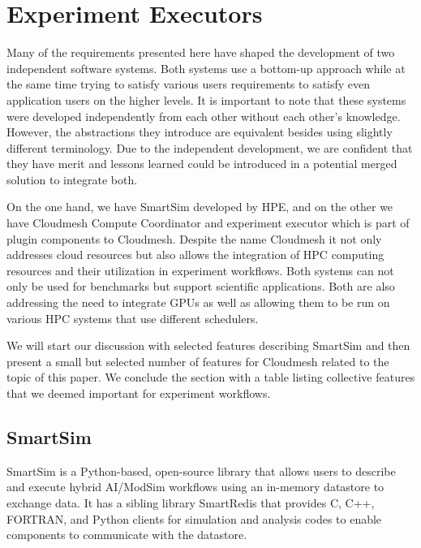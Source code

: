 \documentclass[utf8]{FrontiersinVancouver} %
\begin{document}
\section{Experiment Executors}
\label{sec:executors}

Many of the requirements presented here have shaped the development of two independent software systems. Both systems use a bottom-up approach while at the same time trying to satisfy various users requirements to satisfy even application users on the higher levels. 
It is important to note that these systems were developed independently from each other without each other's knowledge. However, the abstractions they introduce are equivalent besides using slightly different terminology. Due to the independent development, we are confident that they have merit and lessons learned could be introduced in a potential merged solution to integrate both.

On the one hand, we have SmartSim developed by HPE, and on the other we have Cloudmesh Compute Coordinator and experiment executor which is part of plugin components to Cloudmesh. Despite the name Cloudmesh it not only addresses cloud resources but also allows the integration of HPC computing resources and their utilization in experiment workflows. Both systems can not only be used for benchmarks but support scientific applications. Both are also addressing the need to integrate GPUs as well as allowing them to be run on various HPC systems that use different schedulers. 

We will start our discussion with selected features describing SmartSim and then present a small but selected number of features for Cloudmesh related to the topic of this paper. We conclude the section with a table listing collective features that we deemed important for experiment workflows.

\subsection{SmartSim}
\label{sec:smartsim}

SmartSim is a Python-based, open-source library that allows users to describe and execute hybrid AI/ModSim workflows using an in-memory datastore to exchange data. It has a sibling library SmartRedis that provides C, C++, FORTRAN, and  Python clients for simulation and analysis codes to enable components to communicate with the datastore.
\end{document}
